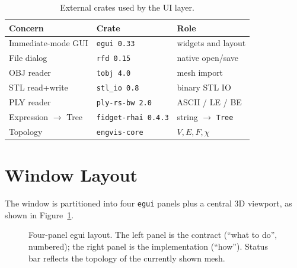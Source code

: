 \documentclass[11pt]{article}
\begin{document}
\begin{table}[h]
\centering
\caption{External crates used by the UI layer.}
\label{tab:crates}
\begin{tabular}{lll}
\toprule
\textbf{Concern} & \textbf{Crate} & \textbf{Role} \\ \midrule
Immediate-mode GUI    & \texttt{egui 0.33}     & widgets and layout \\
File dialog           & \texttt{rfd 0.15}      & native open/save \\
OBJ reader            & \texttt{tobj 4.0}      & mesh import \\
STL read+write        & \texttt{stl\_io 0.8}   & binary STL IO \\
PLY reader            & \texttt{ply-rs-bw 2.0} & ASCII / LE / BE \\
Expression $\to$ Tree & \texttt{fidget-rhai 0.4.3} & string $\to$ \lstinline|Tree| \\
Topology              & \texttt{engvis-core}   & $V,E,F,\chi$ \\
\bottomrule
\end{tabular}
\end{table}

\section{Window Layout}

The window is partitioned into four \texttt{egui} panels plus a central
3D viewport, as shown in Figure~\ref{fig:layout}.

\begin{figure}[h]
\centering
{}
\caption{Four-panel egui layout.  The left panel is the contract
(``what to do'', numbered); the right panel is the implementation
(``how'').  Status bar reflects the topology of the currently shown mesh.}
\label{fig:layout}
\end{figure}
\end{document}
